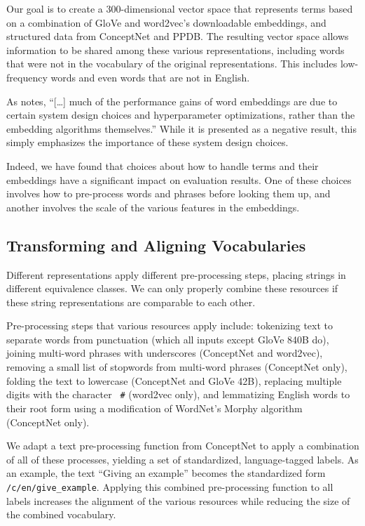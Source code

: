 \documentclass[11pt,letterpaper]{article}
\begin{document}
Our goal is to create a 300-dimensional vector space that represents terms based
on a combination of GloVe and word2vec's downloadable embeddings, and structured
data from ConceptNet and PPDB. The resulting vector space allows information to
be shared among these various representations, including words that were not in
the vocabulary of the original representations. This includes low-frequency words
and even words that are not in English.

As  notes,
``[\ldots] much of the performance gains of word embeddings are due to certain
system design choices and hyperparameter optimizations, rather than the
embedding algorithms themselves.'' While it is presented as a negative result,
this simply emphasizes the importance of these system design choices.

Indeed, we have found that choices about how to handle terms and their
embeddings have a significant impact on evaluation results. One of these choices
involves how to pre-process words and phrases before looking them up, and
another involves the scale of the various features in the embeddings.


\subsection{Transforming and Aligning Vocabularies}
\label{standardizing-text}

Different representations apply
different pre-processing steps, placing strings in different equivalence
classes. We can only properly combine these resources if these string
representations are comparable to each other.

Pre-processing steps that various resources apply include: tokenizing text to
separate words from punctuation (which all inputs except GloVe 840B do),
joining multi-word phrases with underscores (ConceptNet and word2vec), removing
a small list of stopwords from multi-word phrases (ConceptNet only), folding the text to lowercase
(ConceptNet and GloVe 42B), replacing multiple digits with the character {\tt
\#} (word2vec only), and lemmatizing English words to their root form using a
modification of WordNet's Morphy algorithm (ConceptNet only).

We adapt a text pre-processing function from ConceptNet to apply a combination
of all of these processes, yielding a set of standardized, language-tagged
labels. As an example, the text ``Giving an example'' becomes the standardized
form {\tt /c/en/give\_example}. Applying this combined pre-processing function
to all labels increases the alignment of the various resources while reducing
the size of the combined vocabulary.
\end{document}
